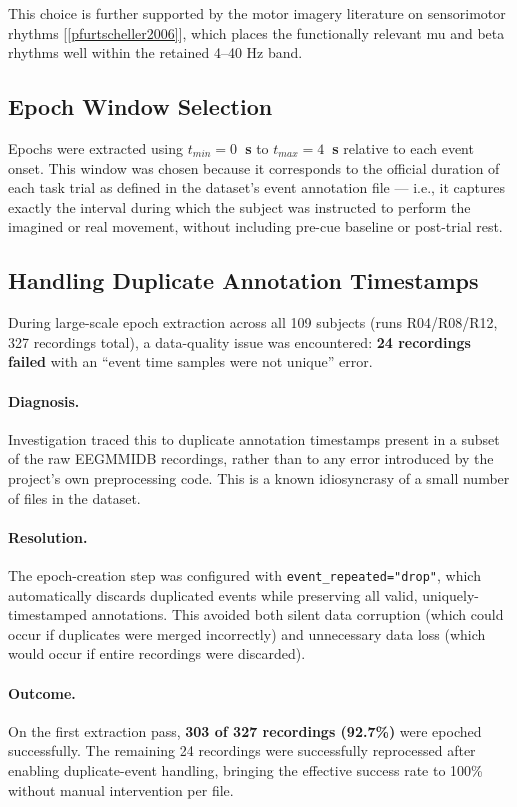\documentclass[11pt,a4paper]{article}
\newcommand{\code}[1]{\texttt{#1}}
\renewcommand{\cite}[1]{[\ref{#1}]}
\begin{document}
This choice is further supported by the motor imagery literature on sensorimotor rhythms \cite{pfurtscheller2006}, which places the functionally relevant mu and beta rhythms well within the retained 4--40 Hz band.

\subsection{Epoch Window Selection}
Epochs were extracted using \textbf{$t_{min}=0$~s} to \textbf{$t_{max}=4$~s} relative to each event onset. This window was chosen because it corresponds to the official duration of each task trial as defined in the dataset's event annotation file --- i.e., it captures exactly the interval during which the subject was instructed to perform the imagined or real movement, without including pre-cue baseline or post-trial rest.

\subsection{Handling Duplicate Annotation Timestamps}
During large-scale epoch extraction across all 109 subjects (runs R04/R08/R12, 327 recordings total), a data-quality issue was encountered: \textbf{24 recordings failed} with an ``event time samples were not unique'' error.

\paragraph{Diagnosis.} Investigation traced this to duplicate annotation timestamps present in a subset of the raw EEGMMIDB recordings, rather than to any error introduced by the project's own preprocessing code. This is a known idiosyncrasy of a small number of files in the dataset.

\paragraph{Resolution.} The epoch-creation step was configured with \code{event\_repeated="drop"}, which automatically discards duplicated events while preserving all valid, uniquely-timestamped annotations. This avoided both silent data corruption (which could occur if duplicates were merged incorrectly) and unnecessary data loss (which would occur if entire recordings were discarded).

\paragraph{Outcome.} On the first extraction pass, \textbf{303 of 327 recordings (92.7\%)} were epoched successfully. The remaining 24 recordings were successfully reprocessed after enabling duplicate-event handling, bringing the effective success rate to 100\% without manual intervention per file.
\end{document}
